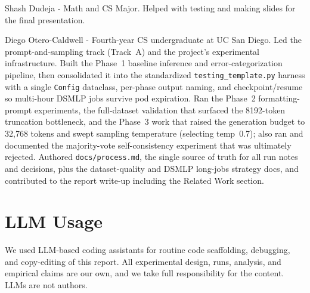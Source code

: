 \documentclass{article}
\begin{document}
Shash Dudeja - Math and CS Major. Helped with testing and making slides for the final presentation.

Diego Otero-Caldwell - Fourth-year CS undergraduate at UC San Diego. Led the prompt-and-sampling track (Track~A) and the project's experimental infrastructure. Built the Phase~1 baseline inference and error-categorization pipeline, then consolidated it into the standardized \texttt{testing\_template.py} harness with a single \texttt{Config} dataclass, per-phase output naming, and checkpoint/resume so multi-hour DSMLP jobs survive pod expiration. Ran the Phase~2 formatting-prompt experiments, the full-dataset validation that surfaced the 8192-token truncation bottleneck, and the Phase~3 work that raised the generation budget to 32{,}768 tokens and swept sampling temperature (selecting temp~0.7); also ran and documented the majority-vote self-consistency experiment that was ultimately rejected. Authored \texttt{docs/process.md}, the single source of truth for all run notes and decisions, plus the dataset-quality and DSMLP long-jobs strategy docs, and contributed to the report write-up including the Related Work section.

\section*{LLM Usage}
We used LLM-based coding assistants for routine code scaffolding, debugging, and copy-editing of
this report. All experimental design, runs, analysis, and empirical claims are our own, and we take
full responsibility for the content. LLMs are not authors.




% 
% 
\end{document}
